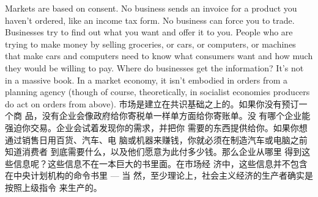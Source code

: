\begin{paracol}{2}
Markets are based on consent. No business sends an invoice for
a product you haven't ordered, like an income tax form. No
business can force you to trade. Businesses try to find out what
you want and offer it to you. People who are trying to make
money by selling groceries, or cars, or computers, or machines
that make cars and computers need to know what consumers
want and how much they would be willing to pay. Where do
businesses get the information? It's not in a massive book. In a
market economy, it isn't embodied in orders from a planning
agency (though of course, theoretically, in socialist economies
producers do act on orders from above).
\switchcolumn
市场是建立在共识基础之上的。如果你没有预订一个商
品，没有企业会像政府给你寄税单一样单方面给你寄账单。没
有哪个企业能强迫你交易。企业会试着发现你的需求，并把你
需要的东西提供给你。如果你想通过销售日用百货、汽车、电
脑或机器来赚钱，你就必须在制造汽车或电脑之前知道消费者
到底需要什么，以及他们愿意为此付多少钱。那么企业从哪里
得到这些信息呢？这些信息不在一本巨大的书里面。在市场经
济中，这些信息并不包含在中央计划机构的命令书里 --- 当
然，至少理论上，社会主义经济的生产者确实是按照上级指令
来生产的。


\end{paracol}
